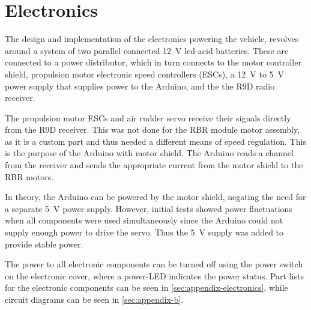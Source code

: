 \section{Electronics}

The design and implementation of the electronics powering the vehicle, revolves around a system of two parallel connected 12~V led-acid batteries. These are connected to a power distributor, which in turn connects to the motor controller shield, propulsion
motor electronic speed controllers (ESCs), 
a 12~V to 5~V power supply that supplies power to the Arduino, and the the R9D radio receiver.

The propulsion motor ESCs and air rudder servo receive their signals directly from the R9D receiver. This was not done for the RBR module motor assembly, as it is a custom part and thus needed a different means of speed regulation. This is the purpose of the Arduino with motor shield. The Arduino reads a channel from the receiver and sends the appropriate current from the motor shield to the RBR motors.

In theory, the Arduino can be powered by the motor shield, negating the need for a separate 5~V power supply.
However, initial tests showed power fluctuations when all components were used simultaneously since the Arduino could not supply enough power to drive the servo. 
Thus the 5~V supply was added to provide stable power.

The power to all electronic components can be turned off using the power switch on the electronic cover, where a power-LED indicates the power status.  Part lists for the electronic components can be seen in \cref{sec:appendix-electronics},
while circuit diagrams can be seen in \cref{sec:appendix-b}.

